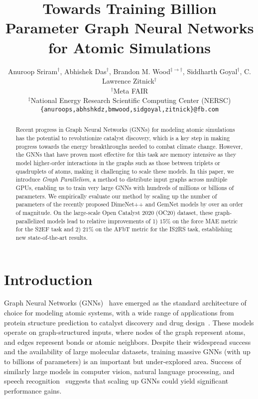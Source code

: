 \documentclass{article} \usepackage{iclr2022_conference,times}
\title{Towards Training Billion Parameter Graph Neural Networks for Atomic Simulations}
\author{Anuroop Sriram$^\dagger$, Abhishek Das$^\dagger$, Brandon M. Wood$^{\ddagger \rightarrow \dagger}$, Siddharth Goyal$^\dagger$, C. Lawrence Zitnick$^\dagger$ \\
$^\dagger$Meta FAIR \\
$^\ddagger$National Energy Research Scientific Computing Center (NERSC) \\
\texttt{\{anuroops,abhshkdz,bmwood,sidgoyal,zitnick\}@fb.com} \\
}
\begin{document}
\maketitle

\begin{abstract}

Recent progress in Graph Neural Networks (GNNs) for modeling atomic simulations
has the potential to revolutionize catalyst discovery, which is a key step in
making progress towards the energy breakthroughs needed to combat climate change.
However, the GNNs that have proven most effective for this task are memory
intensive as they model higher-order interactions in the graphs such as those
between triplets or quadruplets of atoms, making it challenging to scale these models.
In this paper, we introduce \emph{Graph Parallelism}, a method to distribute input
graphs across multiple GPUs, enabling us to train very large GNNs with hundreds
of millions or billions of parameters. We empirically evaluate our method by
scaling up the number of parameters of the recently proposed DimeNet++ and
GemNet models by over an order of magnitude. On the large-scale Open Catalyst 2020 (OC20) dataset,
these graph-parallelized models lead to relative improvements of 1) $15\%$ on
the force MAE metric for the S2EF task and 2) $21\%$ on the AFbT metric for the
IS2RS task, establishing new state-of-the-art results.

\end{abstract}

\section{Introduction}
\label{sec:intro}

Graph Neural Networks (GNNs)~\citep{gori2005new,zhou2020graph} have emerged
as the standard architecture of choice for modeling atomic systems, with
a wide range of applications from protein structure prediction to catalyst discovery and drug design~\citep{schutt2017quantum,gilmer2017neural,jorgensen2018neural,zitnick2020introduction,schutt2017schnet,xie2018crystal}.
These models operate on graph-structured inputs, where nodes of the graph
represent atoms, and edges represent bonds or atomic neighbors. Despite their
widespread success and the availability of large molecular datasets, training massive GNNs (with up to billions of
parameters) is an important but under-explored area. Success of
similarly large models in computer vision, natural language processing, and speech
recognition~\citep{shoeybi2020megatronlm,huang2019gpipe,brown2020language,zhai2021scaling}
suggests that scaling up GNNs could yield significant performance gains.
\end{document}
